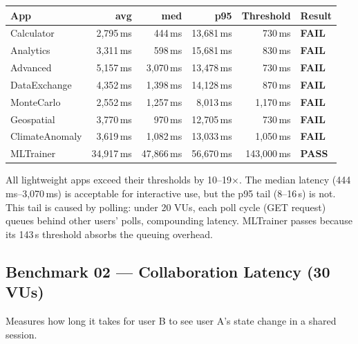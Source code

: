 \documentclass[11pt,a4paper]{article}
\begin{document}
\begin{center}
\begin{tabular}{lrrrrl}
\toprule
\textbf{App} & \textbf{avg} & \textbf{med} & \textbf{p95} & \textbf{Threshold} & \textbf{Result} \\
\midrule
Calculator     &  2,795\,ms &    444\,ms & 13,681\,ms &    730\,ms & \textbf{FAIL} \\
Analytics      &  3,311\,ms &    598\,ms & 15,681\,ms &    830\,ms & \textbf{FAIL} \\
Advanced       &  5,157\,ms &  3,070\,ms & 13,478\,ms &    730\,ms & \textbf{FAIL} \\
DataExchange   &  4,352\,ms &  1,398\,ms & 14,128\,ms &    870\,ms & \textbf{FAIL} \\
MonteCarlo     &  2,552\,ms &  1,257\,ms &  8,013\,ms &  1,170\,ms & \textbf{FAIL} \\
Geospatial     &  3,770\,ms &    970\,ms & 12,705\,ms &    730\,ms & \textbf{FAIL} \\
ClimateAnomaly &  3,619\,ms &  1,082\,ms & 13,033\,ms &  1,050\,ms & \textbf{FAIL} \\
MLTrainer      & 34,917\,ms & 47,866\,ms & 56,670\,ms & 143,000\,ms & \textbf{PASS} \\
\bottomrule
\end{tabular}
\end{center}

\noindent All lightweight apps exceed their thresholds by 10--19$\times$.
The median latency (444\,ms--3,070\,ms) is acceptable for interactive
use, but the p95 tail (8--16\,s) is not. This tail is caused by
polling: under 20 VUs, each poll cycle (GET request) queues behind
other users' polls, compounding latency. MLTrainer passes because its
143\,s threshold absorbs the queuing overhead.

\subsection{Benchmark 02 — Collaboration Latency (30 VUs)}

Measures how long it takes for user B to see user A's state change
in a shared session.
\end{document}
